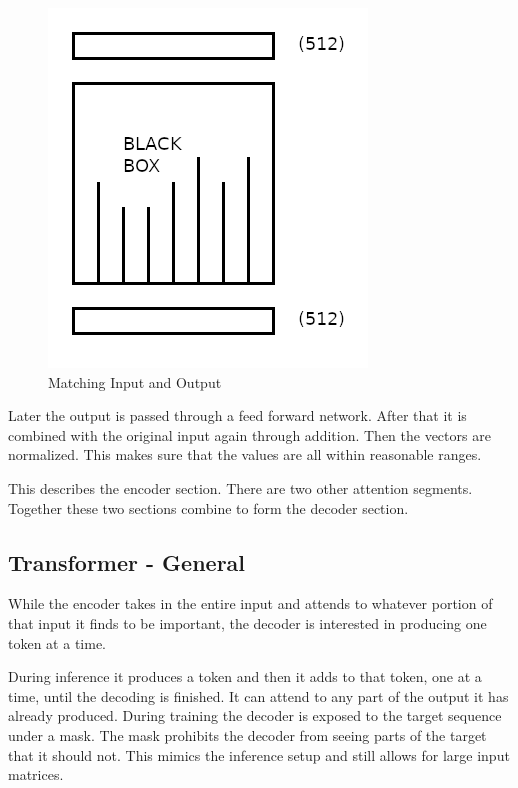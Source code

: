 \begin{figure}[H]
	\begin{center}
		
	
	\includegraphics[scale=0.5]{diagram-mat02}
\end{center}
	\caption[Matching Input and Output]{Matching Input and Output}
	
\end{figure}


Later the output is passed through a feed forward network. After that it is combined with the original input again through addition. Then the vectors are normalized. This makes sure that the values are all within reasonable ranges.

This describes the encoder section. There are two other attention segments. Together these two sections combine to form the decoder section.

\subsection*{Transformer - General}
While the encoder takes in the entire input and attends to whatever portion of that input it finds to be important, the decoder is interested in producing one token at a time. 

During inference it produces a token and then it adds to that token, one at a time, until the decoding is finished. It can attend to any part of the output it has already produced. During training the decoder is exposed to the target sequence under a mask. The mask prohibits the decoder from seeing parts of the target that it should not. This mimics the inference setup and still allows for large input matrices.

